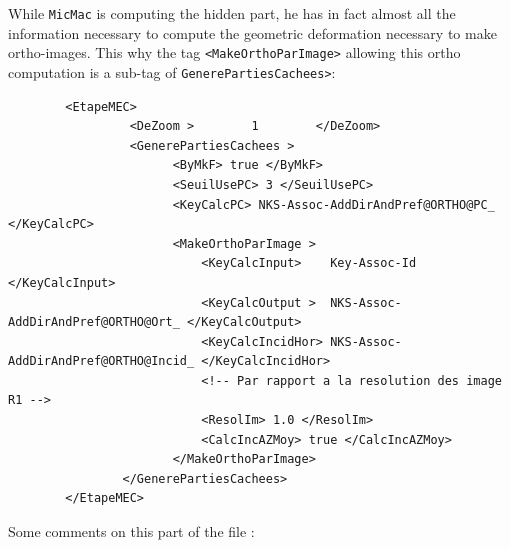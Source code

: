 While {\tt MicMac} is computing the hidden part, he has in fact almost all the information
necessary  to compute the geometric deformation necessary to make ortho-images. This why
the tag {\tt <MakeOrthoParImage>} allowing this ortho computation is a sub-tag of
 {\tt GenerePartiesCachees>}:

{\scriptsize
\begin{verbatim}
        <EtapeMEC>
                 <DeZoom >        1        </DeZoom>
                 <GenerePartiesCachees >
                       <ByMkF> true </ByMkF>
                       <SeuilUsePC> 3 </SeuilUsePC>
                       <KeyCalcPC> NKS-Assoc-AddDirAndPref@ORTHO@PC_ </KeyCalcPC>
                       <MakeOrthoParImage >
                           <KeyCalcInput>    Key-Assoc-Id </KeyCalcInput>
                           <KeyCalcOutput >  NKS-Assoc-AddDirAndPref@ORTHO@Ort_ </KeyCalcOutput>
                           <KeyCalcIncidHor> NKS-Assoc-AddDirAndPref@ORTHO@Incid_ </KeyCalcIncidHor>
                           <!-- Par rapport a la resolution des image R1 -->
                           <ResolIm> 1.0 </ResolIm>
                           <CalcIncAZMoy> true </CalcIncAZMoy>
                       </MakeOrthoParImage>
                </GenerePartiesCachees>
        </EtapeMEC>

\end{verbatim}
}

Some comments on this  part of the file :

